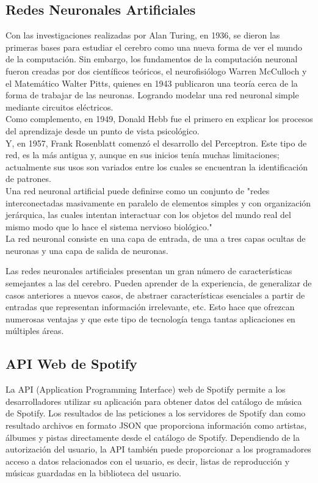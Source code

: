 \documentclass[conference]{IEEEtran}
\begin{document}
\subsection{Redes Neuronales Artificiales}
Con las investigaciones realizadas por Alan Turing, en 1936, se dieron las primeras bases para estudiar el cerebro como una nueva forma de ver el mundo de la computación. Sin embargo, los fundamentos de la computación neuronal fueron creadas por dos científicos teóricos, el neurofisiólogo Warren McCulloch y el Matemático Walter Pitts, quienes en 1943 publicaron una teoría cerca de la forma de trabajar de las neuronas. Logrando modelar una red neuronal simple mediante circuitos eléctricos.\\
Como complemento, en 1949, Donald Hebb fue el primero en explicar los procesos del aprendizaje desde un punto de vista psicológico.\\
Y, en 1957, Frank Rosenblatt comenzó el desarrollo del Perceptron. Este tipo de red, es la más antigua y, aunque en sus inicios tenía muchas limitaciones; actualmente sus usos son variados entre los cuales se encuentran la identificación de patrones.\\

Una red neuronal artificial puede definirse como un conjunto de "redes interconectadas masivamente en paralelo de elementos simples y con organización jerárquica, las cuales intentan interactuar con los objetos del mundo real del mismo modo que lo hace el sistema nervioso biológico." \cite{walter} \\

La red neuronal consiste en una capa de entrada, de una a tres capas ocultas de neuronas y una capa de salida de neuronas. \cite{spri}

Las redes neuronales artificiales presentan un gran número de características semejantes a las del cerebro. Pueden aprender de la experiencia, de generalizar de casos anteriores a nuevos casos, de abstraer características esenciales a partir de entradas que representan información irrelevante, etc. Esto hace que ofrezcan numerosas ventajas y que este tipo de tecnología tenga tantas aplicaciones en múltiples áreas.\\

\subsection{API Web de Spotify}
La API (Application Programming Interface) web de Spotify permite a los desarrolladores utilizar su aplicación para obtener datos del catálogo de música de Spotify. Los resultados de las peticiones a los servidores de Spotify dan como resultado archivos en formato JSON que proporciona información como artistas, álbumes y pistas directamente desde el catálogo de Spotify. Dependiendo de la autorización del usuario, la API también puede proporcionar a los programadores acceso a datos relacionados con el usuario, es decir, listas de reproducción y músicas guardadas en la biblioteca del usuario.\\
\end{document}
